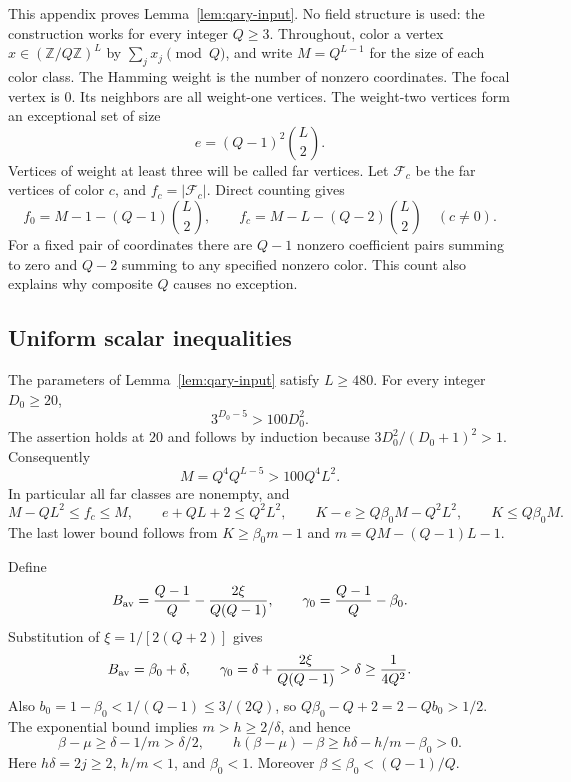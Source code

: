 This appendix proves Lemma~\ref{lem:qary-input}.  No field structure is
used: the construction works for every integer $Q\ge3$.  Throughout,
color a vertex $x\in(\mathbb Z/Q\mathbb Z)^L$ by
$\sum_j x_j\pmod Q$, and write $M=Q^{L-1}$ for the size of each color
class.  The Hamming weight is the number of nonzero coordinates.
The focal vertex is $0$.  Its neighbors are all weight-one vertices.
The weight-two vertices form an exceptional set of size
\[
 e=(Q-1)^2\binom L2.
\]
Vertices of weight at least three will be called far vertices.  Let
$\mathcal F_c$ be the far vertices of color $c$, and $f_c=|\mathcal F_c|$.
Direct counting gives
\begin{equation}
 f_0=M-1-(Q-1)\binom L2,
 \qquad
 f_c=M-L-(Q-2)\binom L2\quad(c\ne0).
 \label{eq:far-counts}
\end{equation}
For a fixed pair of coordinates there are $Q-1$ nonzero coefficient
pairs summing to zero and $Q-2$ summing to any specified nonzero color.
This count also explains why composite $Q$ causes no exception.

\subsection{Uniform scalar inequalities}
\label{app:scalar}

The parameters of Lemma~\ref{lem:qary-input} satisfy $L\ge480$.
For every integer $D_0\ge20$,
\[
 3^{D_0-5}>100D_0^2.
\]
The assertion holds at $20$ and follows by induction because
$3D_0^2/(D_0+1)^2>1$.  Consequently
\begin{equation}
 M=Q^4 Q^{L-5}>100Q^4L^2.
 \label{eq:exponential-margin}
\end{equation}
In particular all far classes are nonempty, and
\begin{equation}
 M-QL^2\le f_c\le M,\qquad
 e+QL+2\le Q^2L^2,\qquad
 K-e\ge Q\beta_0 M-Q^2L^2,\qquad K\le Q\beta_0M.
 \label{eq:elementary-size-bounds}
\end{equation}
The last lower bound follows from $K\ge\beta_0m-1$ and
$m=QM-(Q-1)L-1$.

Define
\[
 B_{\rm av}=\frac{Q-1}{Q}-\frac{2\xi}{Q(Q-1)},\qquad
 \gamma_0=\frac{Q-1}{Q}-\beta_0.
\]
Substitution of $\xi=1/[2(Q+2)]$ gives
\begin{equation}
 B_{\rm av}=\beta_0+\delta,\qquad
 \gamma_0=\delta+\frac{2\xi}{Q(Q-1)}>\delta\ge\frac1{4Q^2}.
 \label{eq:availability-margin}
\end{equation}
Also $b_0=1-\beta_0<1/(Q-1)\le3/(2Q)$, so
$Q\beta_0-Q+2=2-Qb_0>1/2$.
The exponential bound implies
$m>h\ge2/\delta$, and hence
\begin{equation}
 \beta-\mu\ge\delta-1/m>\delta/2,\qquad
 h(\beta-\mu)-\beta
       \ge h\delta-h/m-\beta_0>0.
 \label{eq:off-margin-proof}
\end{equation}
Here $h\delta=2j\ge2$, $h/m<1$, and $\beta_0<1$.
Moreover $\beta\le\beta_0<(Q-1)/Q$.

